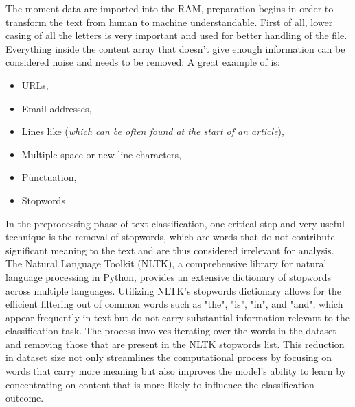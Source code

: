 The moment data are imported into the RAM, preparation begins in order to transform the text from human to machine understandable. 
First of all, lower casing of all the letters is very important and used for better handling of the file.
Everything inside the content array that doesn't give enough information can be considered noise and needs to be removed.
A great example of  is:
\begin{itemize}
	\item URLs,
	\item Email addresses,
	\item Lines like  (\textit{which can be often found at the start of an article}),
	\item Multiple space or new line characters,
	\item Punctuation,
	\item Stopwords
\end{itemize}  

In the preprocessing phase of text classification, one critical step and very useful technique is the removal of stopwords, which are words that do not contribute significant meaning to the text and are thus considered irrelevant for analysis.
The Natural Language Toolkit (NLTK), a comprehensive library for natural language processing in Python, provides an extensive dictionary of stopwords across multiple languages. Utilizing NLTK's stopwords dictionary allows for the efficient filtering out of common words such as "the", "is", "in", and "and", which appear frequently in text but do not carry substantial information relevant to the classification task.
The process involves iterating over the words in the dataset and removing those that are present in the NLTK stopwords list.
This reduction in dataset size not only streamlines the computational process by focusing on words that carry more meaning but also improves the model's ability to learn by concentrating on content that is more likely to influence the classification outcome.\\


